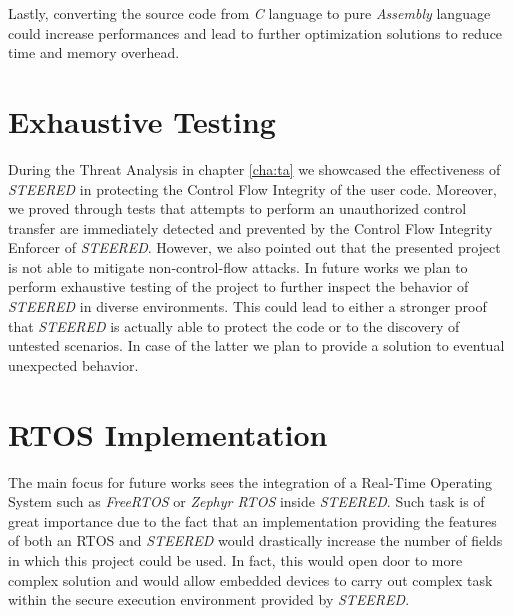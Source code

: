 Lastly, converting the source code from \textit{C} language to pure \textit{Assembly}
language could increase performances and lead to further optimization solutions to
reduce time and memory overhead.

\section{Exhaustive Testing}
\label{sec:future_testing}

During the Threat Analysis in chapter \ref{cha:ta} we showcased the
effectiveness of \textit{STEERED} in protecting the Control Flow Integrity of the
user code. Moreover, we proved through tests that attempts to perform an unauthorized
control transfer are immediately detected and prevented by the Control Flow Integrity
Enforcer of \textit{STEERED}. However, we also pointed out that the presented
project is not able to mitigate non-control-flow attacks. In future works we plan
to perform exhaustive testing of the project to further inspect the behavior of \textit{STEERED}
in diverse environments. This could lead to either a stronger proof that \textit{STEERED}
is actually able to protect the code or to the discovery of untested scenarios. In
case of the latter we plan to provide a solution to eventual unexpected behavior.

\section{RTOS Implementation}
\label{sec:future_rtos}

The main focus for future works sees the integration of a Real-Time Operating
System such as \textit{FreeRTOS} or \textit{Zephyr RTOS} inside \textit{STEERED}.
Such task is of great importance due to the fact that an implementation
providing the features of both an RTOS and \textit{STEERED} would drastically increase
the number of fields in which this project could be used. In fact, this would open
door to more complex solution and would allow embedded devices to carry out complex
task within the secure execution environment provided by \textit{STEERED}.